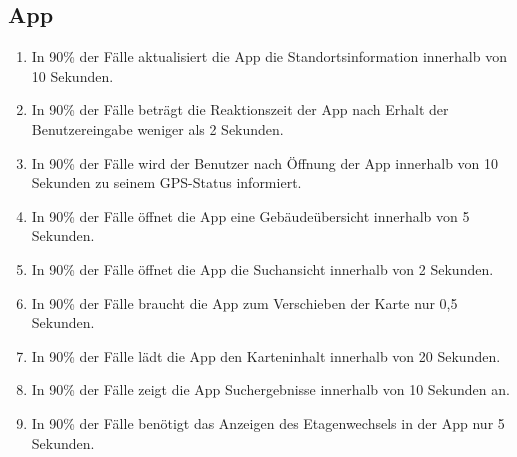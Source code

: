\subsection{App}

\begin{enumerate}
    \item In 90\% der Fälle aktualisiert die App die Standortsinformation innerhalb von 10 Sekunden.
    \item In 90\% der Fälle beträgt die Reaktionszeit der App nach Erhalt der Benutzereingabe weniger als 2 Sekunden.
    \item In 90\% der Fälle wird der Benutzer nach Öffnung der App innerhalb von 10 Sekunden zu seinem GPS-Status informiert.
    \item In 90\% der Fälle öffnet die App eine Gebäudeübersicht innerhalb von 5 Sekunden.
    \item In 90\% der Fälle öffnet die App die Suchansicht innerhalb von 2 Sekunden.
    \item In 90\% der Fälle braucht die App zum Verschieben der Karte nur 0,5 Sekunden.
    \item In 90\% der Fälle lädt die App den Karteninhalt innerhalb von 20 Sekunden.
    \item In 90\% der Fälle zeigt die App Suchergebnisse innerhalb von 10 Sekunden an.
    \item In 90\% der Fälle benötigt das Anzeigen des Etagenwechsels in der App nur 5 Sekunden.
\end{enumerate}